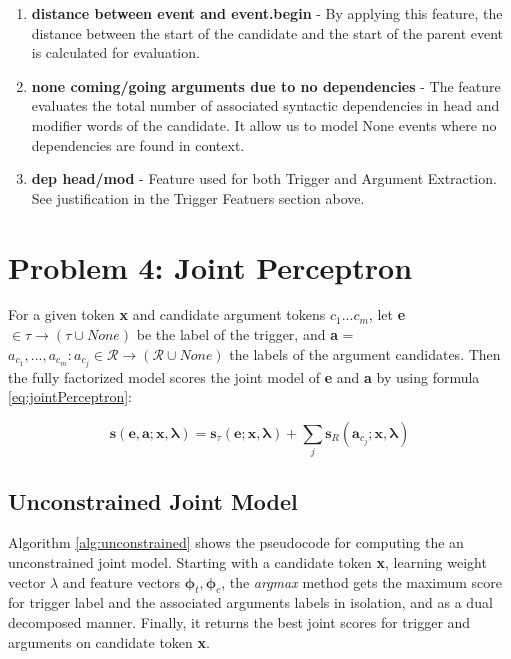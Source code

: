 \documentclass{article} %
\begin{document}
\begin{enumerate}
\item \textbf{distance between event and event.begin} - By applying this feature, the distance between the start of the candidate and the start of the parent event is calculated for evaluation.

\item \textbf{none coming/going arguments due to no dependencies} - The feature evaluates the total number of associated syntactic dependencies in head and modifier words of the candidate. It allow us to model None events where no dependencies are found in context.

\item \textbf{dep head/mod} - Feature used for both Trigger and Argument Extraction. See justification in the Trigger Featuers section above.

\end{enumerate}

\section*{Problem 4: Joint Perceptron\cite{riedel2011robust}}

For a given token \textbf{x} and candidate argument tokens $c_1 ... c_m$, let \textbf{e} $\in \tau \rightarrow (\tau \cup None)$  be the label of the trigger, and \textbf{a} = $a_{c_1},...,a_{c_m}: a_{c_j} \in \mathcal{R} \rightarrow (\mathcal{R} \cup None)$ the labels of the argument candidates. Then the fully factorized model scores the joint model of \textbf{e} and \textbf{a} by using formula \ref{eq:jointPerceptron}:

\begin{equation}
\label{eq:jointPerceptron}
\textbf{s}(\textbf{e}, \textbf{a}; \textbf{x}, \boldsymbol{\lambda}) = \textbf{s}_\tau(\textbf{e}; \textbf{x}, \boldsymbol{\lambda}) + \sum_{j}\textbf{s}_R(\textbf{a}_{c_j}; \textbf{x}, \boldsymbol{\lambda})
\end{equation}

\subsection*{Unconstrained Joint Model}

Algorithm \ref{alg:unconstrained} shows the pseudocode for computing the an unconstrained joint model. Starting with a candidate token \textbf{x}, learning weight vector \textbf{$\lambda$} and feature vectors $\boldsymbol{\phi}_t, \boldsymbol{\phi}_c$, the \textit{argmax} method gets the maximum score for trigger label and the associated arguments labels in isolation, and as a dual decomposed manner. Finally, it returns the best joint scores for trigger and arguments on candidate token \textbf{x}.
\end{document}

